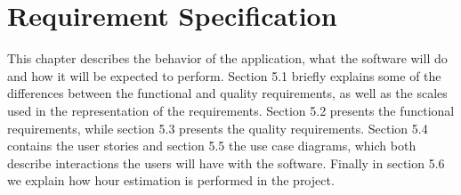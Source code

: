 \chapter{Requirement Specification}

	This chapter describes the behavior of the application, what the software will do 
	and how it will be expected to perform. Section 5.1 briefly explains some of the differences between the functional and quality requirements, as well as the scales used in the representation of the requirements. Section 5.2 presents the functional requirements, while section 5.3 presents the quality requirements. Section 5.4 contains the user stories and section 5.5 the use case diagrams, which both describe interactions the users will have with the software. Finally in section 5.6 we explain how hour estimation is performed in the project.